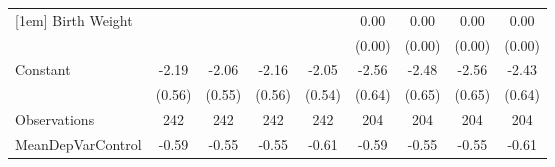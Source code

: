 {\begin{tabular}{l*{8}{c}}
[1em]
Birth Weight        &                     &                     &                     &                     &        0.00\sym{**} &        0.00\sym{**} &        0.00\sym{**} &        0.00\sym{**} \\
                    &                     &                     &                     &                     &      (0.00)         &      (0.00)         &      (0.00)         &      (0.00)         \\
[1em]
Constant            &       -2.19\sym{***}&       -2.06\sym{***}&       -2.16\sym{***}&       -2.05\sym{***}&       -2.56\sym{***}&       -2.48\sym{***}&       -2.56\sym{***}&       -2.43\sym{***}\\
                    &      (0.56)         &      (0.55)         &      (0.56)         &      (0.54)         &      (0.64)         &      (0.65)         &      (0.65)         &      (0.64)         \\
\hline
Observations        &         242         &         242         &         242         &         242         &         204         &         204         &         204         &         204         \\
MeanDepVarControl   &       -0.59         &       -0.55         &       -0.55         &       -0.61         &       -0.59         &       -0.55         &       -0.55         &       -0.61         \\
\hline\hline
\end{tabular}
}
